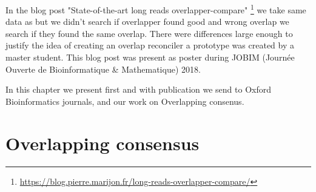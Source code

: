 \documentclass[main.tex]{subfiles}
\begin{document}
In the blog post "State-of-the-art long reads overlapper-compare" \footnote{\url{https://blog.pierre.marijon.fr/long-reads-overlapper-compare/}} we take same data as \cite{ovl_bench} but we didn't search if overlapper found good and wrong overlap we search if they found the same overlap. There were differences large enough to justify the idea of creating an overlap reconciler a prototype was created by a master student. 
This blog post was present as poster during JOBIM (Journée Ouverte de Bioinformatique \& Mathematique) 2018.


In this chapter we present first \yacrd and \fpa with publication we send to Oxford Bioinformatics journals, and our work on Overlapping consenus.



%


\section{Overlapping consensus}\label{section:preassembly:ovl_consensus}



\end{document}
